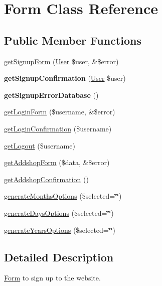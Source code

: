 \hypertarget{classForm}{\section{Form Class Reference}
\label{classForm}
}
\subsection*{Public Member Functions}
\begin{DoxyCompactItemize}
\item 
\hyperlink{classForm_a3e3459dffd7067e2e707e0a622945a66}{get\+Signup\+Form} (\hyperlink{classUser}{User} \$user, \&\$error)
\item 
\hypertarget{classForm_a6a05f450eb73a3524602817c34da17be}{{\bfseries get\+Signup\+Confirmation} (\hyperlink{classUser}{User} \$user)}\label{classForm_a6a05f450eb73a3524602817c34da17be}

\item 
\hypertarget{classForm_a11a02f548641b39c9c7c04436c95befa}{{\bfseries get\+Signup\+Error\+Database} ()}\label{classForm_a11a02f548641b39c9c7c04436c95befa}

\item 
\hyperlink{classForm_aa3ff4d216868165f1f8c442ae7ea7c95}{get\+Login\+Form} (\$username, \&\$error)
\item 
\hyperlink{classForm_a61045a8ccfd7f300a729027a70a00700}{get\+Login\+Confirmation} (\$username)
\item 
\hyperlink{classForm_a08c23069323910390d5fc8d4ede9690d}{get\+Logout} (\$username)
\item 
\hyperlink{classForm_a9fe8a5c4812f4cbe0ff7daa05ea40cbf}{get\+Addshop\+Form} (\$data, \&\$error)
\item 
\hyperlink{classForm_a00d84099c9d0a8fd6cdc77983b2dac93}{get\+Addshop\+Confirmation} ()
\item 
\hyperlink{classForm_a12b1a6bb3a44baa1b311e8cc42759f9c}{generate\+Months\+Options} (\$selected=\char`\"{}\char`\"{})
\item 
\hyperlink{classForm_ae79e7e1de18f9f611d1e405349828104}{generate\+Days\+Options} (\$selected=\char`\"{}\char`\"{})
\item 
\hyperlink{classForm_a5bcd8bfb0770d2ca9e6874b329ab7f58}{generate\+Years\+Options} (\$selected=\char`\"{}\char`\"{})
\end{DoxyCompactItemize}


\subsection{Detailed Description}
\hyperlink{classForm}{Form} to sign up to the website. 


